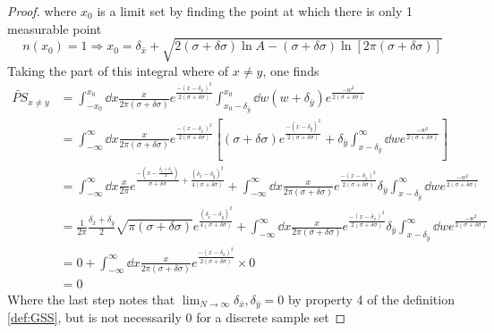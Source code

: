 \begin{proof}{}
	where $x_0$ is a limit set by finding the point at which there is only 1 measurable point
		\begin{equation}
			n(x_0) = 1 \Rightarrow x_0 =\delta_{\bar{x}}+ \sqrt{2 (\sigma+\delta \sigma) \ln A - (\sigma+\delta \sigma) \ln \left[ 2 \pi \left( \sigma + \delta \sigma \right) \right]}
		\end{equation}
	Taking the part of this integral where of $x \neq y$, one finds
		\begin{equation}
			\begin{split}
				\widetilde{PS}_{x\neq y} &= \int_{-x_0}^{x_0} \dd x \frac{x}{2 \pi \left( \sigma + \delta \sigma \right)} e^{\frac{- \left( x - \delta_{\bar{x}} \right)^2}{2 \left( \sigma + \delta \sigma \right) }} \int_{x_0 - \delta_{\bar{y}} }^{x_0} \dd w \left( w + \delta_{\bar{y}} \right) e^{\frac{- w^2}{2 \left( \sigma + \delta \sigma \right)} }\\
				&= \int_{-\infty}^{\infty} \dd x \frac{x}{2 \pi \left( \sigma + \delta \sigma \right)} e^{\frac{- \left( x - \delta_{\bar{x}} \right)^2}{2 \left( \sigma + \delta \sigma \right) }} \left[ \left( \sigma + \delta \sigma \right) e^{\frac{- \left( x - \delta_{\bar{y}} \right)^2}{2 \left( \sigma + \delta \sigma \right) }} + \delta_{\bar{y}} \int_{x-\delta_{\bar{y}}}^\infty \dd w e^{\frac{- w^2}{2 \left( \sigma + \delta \sigma \right) }} \right]\\
				&= \int_{-\infty}^{\infty} \dd x \frac{x}{2 \pi} e^{\frac{- \left( x - \frac{\delta_{\bar{x}} + \delta_{\bar{y}}}{2} \right)}{\sigma + \delta \sigma} + \frac{\left( \delta_{\bar{x}} - \delta_{\bar{y}}\right)^2}{4(\sigma+ \delta \sigma)}} + \int_{-\infty}^{\infty} \dd x \frac{x}{2 \pi \left( \sigma + \delta \sigma \right)} e^{\frac{- \left( x - \delta_{\bar{x}} \right)^2}{2 \left( \sigma + \delta \sigma \right) }}\delta_{\bar{y}} \int_{x-\delta_{\bar{y}}}^\infty \dd w e^{\frac{- w^2}{2 \left( \sigma + \delta \sigma \right) }} \\
				&= \frac{1}{2\pi} \frac{\delta_{\bar{x}} + \delta_{\bar{y}}}{2} \sqrt{\pi \left( \sigma + \delta \sigma \right) } e^{\frac{\left( \delta_{\bar{x}} - \delta_{\bar{y}}\right)^2}{4(\sigma+ \delta \sigma)}} +  \int_{-\infty}^{\infty} \dd x \frac{x}{2 \pi \left( \sigma + \delta \sigma \right)} e^{\frac{- \left( x - \delta_{\bar{x}} \right)^2}{2 \left( \sigma + \delta \sigma \right) }} \delta_{\bar{y}} \int_{x-\delta_{\bar{y}}}^\infty \dd w e^{\frac{- w^2}{2 \left( \sigma + \delta \sigma \right) }} \\
				& = 0   +  \int_{-\infty}^{\infty} \dd x \frac{x}{2 \pi \left( \sigma + \delta \sigma \right)} e^{\frac{- \left( x - \delta_{\bar{x}} \right)^2}{2 \left( \sigma + \delta \sigma \right) }} \times 0 \\ 
				&= 0 
			\end{split}
		\end{equation}
	Where the last step notes that $\lim_{N \rightarrow \infty} \delta_{\bar{x}}, \delta_{\bar{y}} = 0 $ by property 4 of the definition \ref{def:GSS}, but is not necessarily 0 for a discrete sample set 


\end{proof}
